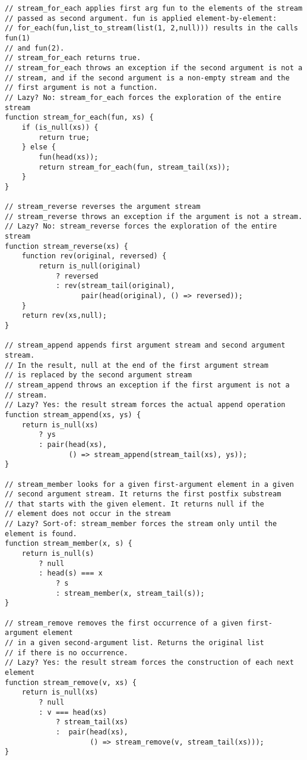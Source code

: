 \begin{lstlisting}
// stream_for_each applies first arg fun to the elements of the stream
// passed as second argument. fun is applied element-by-element:
// for_each(fun,list_to_stream(list(1, 2,null))) results in the calls fun(1)
// and fun(2).
// stream_for_each returns true.
// stream_for_each throws an exception if the second argument is not a 
// stream, and if the second argument is a non-empty stream and the
// first argument is not a function.
// Lazy? No: stream_for_each forces the exploration of the entire stream
function stream_for_each(fun, xs) {
    if (is_null(xs)) {
        return true;
    } else {
        fun(head(xs));
        return stream_for_each(fun, stream_tail(xs));
    }
}

// stream_reverse reverses the argument stream
// stream_reverse throws an exception if the argument is not a stream.
// Lazy? No: stream_reverse forces the exploration of the entire stream
function stream_reverse(xs) {
    function rev(original, reversed) {
        return is_null(original)
            ? reversed
            : rev(stream_tail(original), 
                  pair(head(original), () => reversed));
    }
    return rev(xs,null);
}

// stream_append appends first argument stream and second argument stream.
// In the result, null at the end of the first argument stream
// is replaced by the second argument stream
// stream_append throws an exception if the first argument is not a
// stream.
// Lazy? Yes: the result stream forces the actual append operation
function stream_append(xs, ys) {
    return is_null(xs)
        ? ys
        : pair(head(xs),
               () => stream_append(stream_tail(xs), ys)); 
}

// stream_member looks for a given first-argument element in a given
// second argument stream. It returns the first postfix substream
// that starts with the given element. It returns null if the
// element does not occur in the stream
// Lazy? Sort-of: stream_member forces the stream only until the element is found.
function stream_member(x, s) {
    return is_null(s)
        ? null
        : head(s) === x
            ? s
            : stream_member(x, stream_tail(s));
}

// stream_remove removes the first occurrence of a given first-argument element
// in a given second-argument list. Returns the original list
// if there is no occurrence.
// Lazy? Yes: the result stream forces the construction of each next element
function stream_remove(v, xs) {
    return is_null(xs)
        ? null
        : v === head(xs)
            ? stream_tail(xs)
            :  pair(head(xs), 
                    () => stream_remove(v, stream_tail(xs))); 
}


\end{lstlisting}
